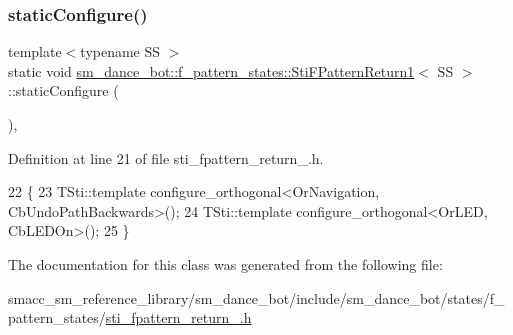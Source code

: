 \subsubsection{\texorpdfstring{static\+Configure()}{staticConfigure()}}
{\footnotesize\ttfamily template$<$typename SS $>$ \\
static void \hyperlink{structsm__dance__bot_1_1f__pattern__states_1_1StiFPatternReturn1}{sm\+\_\+dance\+\_\+bot\+::f\+\_\+pattern\+\_\+states\+::\+Sti\+F\+Pattern\+Return1}$<$ SS $>$\+::static\+Configure (\begin{DoxyParamCaption}{ }\end{DoxyParamCaption})\hspace{0.3cm}{\ttfamily [inline]}, {\ttfamily [static]}}



Definition at line 21 of file sti\+\_\+fpattern\+\_\+return\+\_.\+h.


\begin{DoxyCode}
22   \{
23     TSti::template configure\_orthogonal<OrNavigation, CbUndoPathBackwards>();
24     TSti::template configure\_orthogonal<OrLED, CbLEDOn>();
25   \}
\end{DoxyCode}


The documentation for this class was generated from the following file\+:\begin{DoxyCompactItemize}
\item 
smacc\+\_\+sm\+\_\+reference\+\_\+library/sm\+\_\+dance\+\_\+bot/include/sm\+\_\+dance\+\_\+bot/states/f\+\_\+pattern\+\_\+states/\hyperlink{sm__dance__bot_2include_2sm__dance__bot_2states_2f__pattern__states_2sti__fpattern__return__1_8h}{sti\+\_\+fpattern\+\_\+return\+\_.\+h}\end{DoxyCompactItemize}
